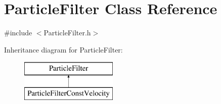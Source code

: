 \hypertarget{classParticleFilter}{}\section{Particle\+Filter Class Reference}
\label{classParticleFilter}


{\ttfamily \#include $<$Particle\+Filter.\+h$>$}

Inheritance diagram for Particle\+Filter\+:\begin{figure}[H]
\begin{center}
\leavevmode
\includegraphics[height=2.000000cm]{classParticleFilter}
\end{center}
\end{figure}
